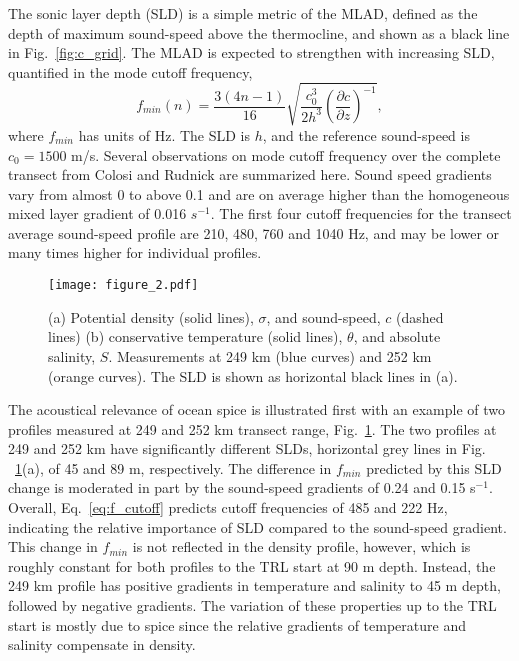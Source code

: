 \documentclass[preprint,NumberedRefs]{JASA}
\begin{document}
The sonic layer depth (SLD) is a simple metric of the MLAD, defined as the depth of maximum sound-speed above the thermocline, and shown as a black line in Fig.~\ref{fig:c_grid}. The MLAD is expected to strengthen with increasing SLD, quantified in the mode cutoff frequency\citep{Urick1982Prop},
\begin{equation}
    f_{min}(n) = \frac{3(4n-1)}{16} \sqrt{\frac{c_0^3}{2h^3} \left( \frac{\partial c}{\partial z} \right) ^ {-1}},
    \label{eq:f_cutoff}
\end{equation}
where $f_{min}$ has units of Hz. The SLD is $h$, and the reference sound-speed is $c_0 = 1500$ m/s. Several observations on mode cutoff frequency over the complete transect from Colosi and Rudnick\cite{colosi2020observations} are summarized here. Sound speed gradients vary from almost 0 to above 0.1 and are on average higher than the homogeneous mixed layer gradient of 0.016 $s^{-1}$. The first four cutoff frequencies for the transect average sound-speed profile are 210, 480, 760 and 1040 Hz, and may be lower or many times higher for individual profiles.

\begin{figure}
    \texttt{[image: figure\_2.pdf]}
    \caption{\label{fig:profiles}{(a) Potential density (solid lines), $\sigma$, and sound-speed, $c$ (dashed lines) (b) conservative temperature (solid lines), $\theta$, and absolute salinity, $S$. Measurements at 249 km (blue curves) and 252 km (orange curves). The SLD is shown as horizontal black lines in (a).}}
\end{figure}

The acoustical relevance of ocean spice is illustrated first with an example of two profiles measured at 249 and 252 km transect range, Fig.~\ref{fig:profiles}. The two profiles at 249 and 252 km have significantly different SLDs, horizontal grey lines in Fig. ~\ref{fig:profiles}(a), of 45 and 89 m, respectively. The difference in $f_{min}$ predicted by this SLD change is moderated in part by the sound-speed gradients of 0.24 and 0.15 s$^{-1}$. Overall, Eq.~\eqref{eq:f_cutoff} predicts cutoff frequencies of 485 and 222 Hz, indicating the relative importance of SLD compared to the sound-speed gradient. This change in $f_{min}$ is not reflected in the density profile, however, which is roughly constant for both profiles to the TRL start at 90 m depth. Instead, the 249 km profile has positive gradients in temperature and salinity to 45 m depth, followed by negative gradients. The variation of these properties up to the TRL start is mostly due to spice since the relative gradients of temperature and salinity compensate in density.
\end{document}
